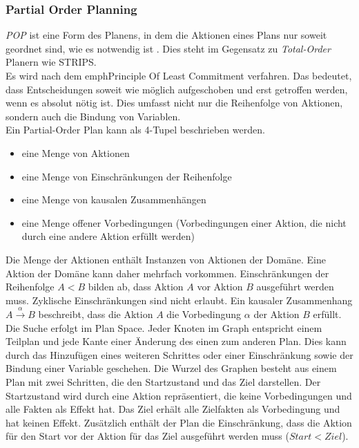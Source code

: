 \subsubsection{Partial Order Planning}{\label{section:pop}}
\emph{\acf{POP}} ist eine Form des Planens, in dem die Aktionen eines Plans nur soweit geordnet sind, wie es notwendig ist \cite{dyer_2003}.
Dies steht im Gegensatz zu \emph{Total-Order} Planern wie \ac{STRIPS}.\\
Es wird nach dem emph{Principle Of Least Commitment} verfahren.
Das bedeutet, dass Entscheidungen soweit wie möglich aufgeschoben und erst getroffen werden, wenn es absolut nötig ist.
Dies umfasst nicht nur die Reihenfolge von Aktionen, sondern auch die Bindung von Variablen.\\
Ein Partial-Order Plan kann als 4-Tupel \cite{grastien} beschrieben werden.
\begin{itemize}
    \item eine Menge von Aktionen
    \item eine Menge von Einschränkungen der Reihenfolge
    \item eine Menge von kausalen Zusammenhängen
    \item eine Menge offener Vorbedingungen (Vorbedingungen einer Aktion, die nicht durch eine andere Aktion erfüllt werden)
\end{itemize}
Die Menge der Aktionen enthält Instanzen von Aktionen der Domäne.
Eine Aktion der Domäne kann daher mehrfach vorkommen.
Einschränkungen der Reihenfolge $A < B$ bilden ab, dass Aktion $A$ vor Aktion $B$ ausgeführt werden muss.
Zyklische Einschränkungen sind nicht erlaubt.
Ein kausaler Zusammenhang $A \xrightarrow{\alpha} B$ beschreibt, dass die Aktion $A$ die Vorbedingung $\alpha$ der Aktion $B$ erfüllt.\\
Die Suche erfolgt im Plan Space.
Jeder Knoten im Graph entspricht einem Teilplan und jede Kante einer Änderung des einen zum anderen Plan.
Dies kann durch das Hinzufügen eines weiteren Schrittes oder einer Einschränkung sowie der Bindung einer Variable geschehen.
Die Wurzel des Graphen besteht aus einem Plan mit zwei Schritten, die den Startzustand und das Ziel darstellen.
Der Startzustand wird durch eine Aktion repräsentiert, die keine Vorbedingungen und alle Fakten als Effekt hat.
Das Ziel erhält alle Zielfakten als Vorbedingung und hat keinen Effekt.
Zusätzlich enthält der Plan die Einschränkung, dass die Aktion für den Start vor der Aktion für das Ziel ausgeführt werden muss ($Start < Ziel$).\\
